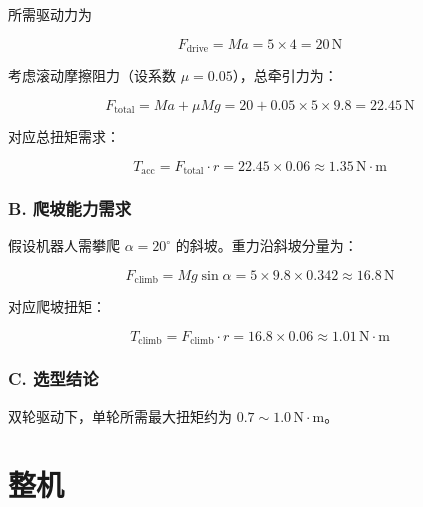 所需驱动力为

\begin{equation}
  F_{\text{drive}} = Ma = 5 \times 4 = 20\,\mathrm{N}
\end{equation}

考虑滚动摩擦阻力（设系数 $\mu = 0.05$），总牵引力为：

\begin{equation}
  F_{\text{total}} = Ma + \mu Mg
  = 20 + 0.05 \times 5 \times 9.8
  = 22.45\,\mathrm{N}
\end{equation}

对应总扭矩需求：

\begin{equation}
  T_{\text{acc}} = F_{\text{total}} \cdot r
  = 22.45 \times 0.06
  \approx 1.35\,\mathrm{N\cdot m}
\end{equation}

\subsubsection*{B. 爬坡能力需求}

假设机器人需攀爬 $\alpha = 20^\circ$ 的斜坡。重力沿斜坡分量为：

\begin{equation}
  F_{\text{climb}} = Mg \sin \alpha
  = 5 \times 9.8 \times 0.342
  \approx 16.8\,\mathrm{N}
\end{equation}

对应爬坡扭矩：

\begin{equation}
  T_{\text{climb}} = F_{\text{climb}} \cdot r
  = 16.8 \times 0.06
  \approx 1.01\,\mathrm{N\cdot m}
\end{equation}

\subsubsection*{C. 选型结论}

双轮驱动下，单轮所需最大扭矩约为 $0.7 \sim 1.0\,\mathrm{N\cdot m}$。

\section{整机}

